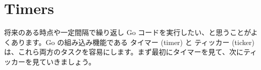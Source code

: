 \section{Timers}

将来のある時点や一定間隔で繰り返し Go コードを実行したい、と思うことがよくあります。Go の組み込み機能である タイマー (timer) と ティッカー (ticker) は、これら両方のタスクを容易にします。まず最初にタイマーを見て、次にティッカーを見ていきましょう。





